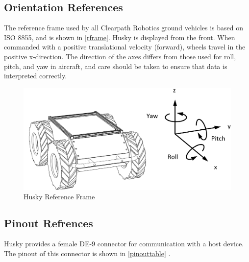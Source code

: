 \documentclass[]{clearpath-latex/clearpath-manual}
\begin{document}
\subsection{Orientation References}

The reference frame used by all Clearpath Robotics ground vehicles is based on ISO 8855, and is shown in \autoref{rframe}. Husky is displayed from the front. When commanded with a positive translational velocity (forward), wheels travel in the positive x-direction.
The direction of the axes differs from those used for roll, pitch, and yaw in aircraft, and care should be taken to ensure that data is interpreted correctly.

 \begin{figure}[h]
	\includegraphics[width=\textwidth]{rframe.png}
	\caption{Husky Reference Frame}
	\label{rframe}
 \end{figure}

\subsection{Pinout Refrences}

Husky provides a female DE-9 connector for communication with a host device. The pinout of this connector is shown in \autoref{pinouttable} .
\end{document}
